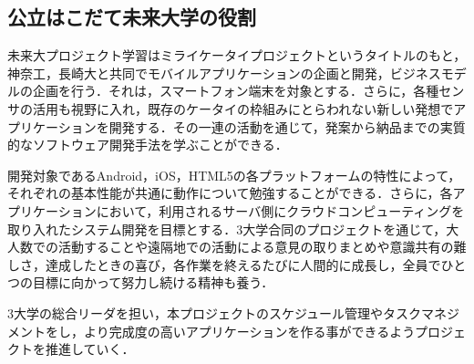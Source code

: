 \subsection{公立はこだて未来大学の役割}
\par 未来大プロジェクト学習はミライケータイプロジェクトというタイトルのもと，神奈工，長崎大と共同でモバイルアプリケーションの企画と開発，ビジネスモデルの企画を行う．それは，スマートフォン端末を対象とする．さらに，各種センサの活用も視野に入れ，既存のケータイの枠組みにとらわれない新しい発想でアプリケーションを開発する．その一連の活動を通じて，発案から納品までの実質的なソフトウェア開発手法を学ぶことができる．
\par 開発対象であるAndroid，iOS，HTML5の各プラットフォームの特性によって，それぞれの基本性能が共通に動作について勉強することができる．さらに，各アプリケーションにおいて，利用されるサーバ側にクラウドコンピューティングを取り入れたシステム開発を目標とする．3大学合同のプロジェクトを通じて，大人数での活動することや遠隔地での活動による意見の取りまとめや意識共有の難しさ，達成したときの喜び，各作業を終えるたびに人間的に成長し，全員でひとつの目標に向かって努力し続ける精神も養う．
\par 3大学の総合リーダを担い，本プロジェクトのスケジュール管理やタスクマネジメントをし，より完成度の高いアプリケーションを作る事ができるようプロジェクトを推進していく．
